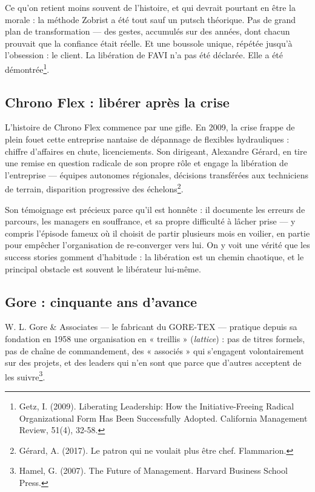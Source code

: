 Ce qu'on retient moins souvent de l'histoire, et qui devrait pourtant en être la morale : la méthode Zobrist a été tout sauf un putsch théorique. Pas de grand plan de transformation — des gestes, accumulés sur des années, dont chacun prouvait que la confiance était réelle. Et une boussole unique, répétée jusqu'à l'obsession : le client. La libération de FAVI n'a pas été déclarée. Elle a été démontrée\footnote{Getz, I. (2009). Liberating Leadership: How the Initiative-Freeing Radical Organizational Form Has Been Successfully Adopted. California Management Review, 51(4), 32-58.}.

\subsection{Chrono Flex : libérer après la crise}

L'histoire de Chrono Flex commence par une gifle. En 2009, la crise frappe de plein fouet cette entreprise nantaise de dépannage de flexibles hydrauliques : chiffre d'affaires en chute, licenciements. Son dirigeant, Alexandre Gérard, en tire une remise en question radicale de son propre rôle et engage la libération de l'entreprise — équipes autonomes régionales, décisions transférées aux techniciens de terrain, disparition progressive des échelons\footnote{Gérard, A. (2017). Le patron qui ne voulait plus être chef. Flammarion.}.

Son témoignage est précieux parce qu'il est honnête : il documente les erreurs de parcours, les managers en souffrance, et sa propre difficulté à lâcher prise — y compris l'épisode fameux où il choisit de partir plusieurs mois en voilier, en partie pour empêcher l'organisation de re-converger vers lui. On y voit une vérité que les success stories gomment d'habitude : la libération est un chemin chaotique, et le principal obstacle est souvent le libérateur lui-même.

\subsection{Gore : cinquante ans d'avance}

W. L. Gore \& Associates — le fabricant du GORE-TEX — pratique depuis sa fondation en 1958 une organisation en « treillis » (\emph{lattice}) : pas de titres formels, pas de chaîne de commandement, des « associés » qui s'engagent volontairement sur des projets, et des leaders qui n'en sont que parce que d'autres acceptent de les suivre\footnote{Hamel, G. (2007). The Future of Management. Harvard Business School Press.}.

